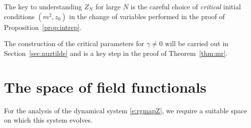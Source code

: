 \begin{rk}
\label{rk:crit-params}
% 
The key to understanding
$Z_N$ for large $N$ is the careful choice of \emph{critical} initial conditions
$(m^2, z_0)$ 
in the change of variables performed in the proof of Proposition~\ref{prop:intrep}.

The construction of the critical parameters for $\gamma \ne 0$ will be carried
out in Section~\ref{sec:nuztilde} and is a key step in the proof of Theorem~\ref{thm:mr}.
\end{rk}



\section{The space of field functionals}
\label{sec:Ncal}

For the analysis of the dynamical system \eqref{e:rgmapZ}, we require a suitable
space on which this system evolves.

